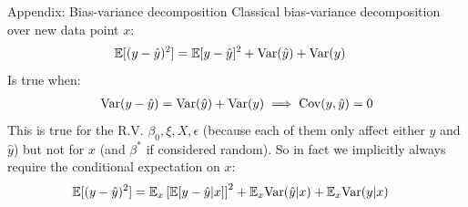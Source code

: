 \documentclass[10pt]{beamer}
\begin{document}
\begin{frame}{Appendix: Bias-variance decomposition}
  Classical bias-variance decomposition over new data point $x$:
  \begin{align}
    \mathbb E[(y - \hat y )^2] & = \mathbb E[y - \hat y]^2 + \text{Var}(\hat y) + \text{Var}(y)
  \end{align}
  Is true when:
  \begin{align}
    \text{Var}(y - \hat y) = \text{Var}(\hat y) + \text{Var}(y)
    \implies \text{Cov}(y, \hat y)=0
  \end{align}
  This is true for the R.V. $\beta_0, \xi, X, \epsilon$ (because each of them only affect either $y$ and $\hat y$) but not for $x$ (and $\beta^*$ if considered random). So in fact we implicitly always require the conditional expectation on $x$:
  \begin{align}
    \mathbb E[(y - \hat y )^2] & = \mathbb E_x\left[ \mathbb E[y - \hat y| x]\right]^2 + \mathbb E_x \text{Var}(\hat y | x) + \mathbb E_x \text{Var}(y | x)
  \end{align}
\end{frame}
\end{document}
